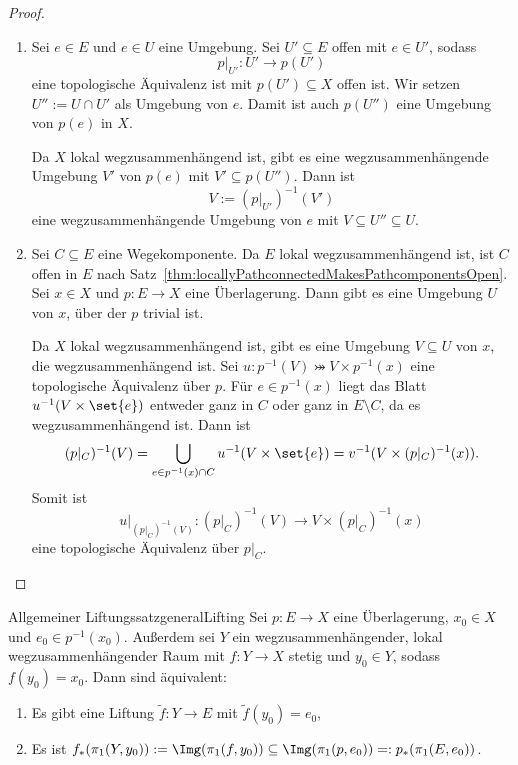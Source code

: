 \documentclass[language=ngerman]{TemplateLecture} %
\begin{document}
\begin{proof}
    \begin{enumerate}[$(i)$:]
        \item Sei $e \in E$ und $e \in U$ eine Umgebung. Sei $U' \subseteq E$ offen mit $e \in U'$, sodass
        \begin{equation*}
            p|_{U'} : U' \to p(U')
        \end{equation*}
        eine topologische Äquivalenz ist mit $p(U') \subseteq X$ offen ist. Wir setzen $U'' := U \cap U'$ als Umgebung von $e$. Damit ist auch $p(U'')$ eine Umgebung von $p(e)$ in $X$.

        Da $X$ lokal wegzusammenhängend ist, gibt es eine wegzusammenhängende Umgebung $V'$ von $p(e)$ mit $V' \subseteq p(U'')$. Dann ist
        \begin{equation*}
            V := \left(p|_{U'}\right)^{-1}(V')
        \end{equation*}
        eine wegzusammenhängende Umgebung von $e$ mit $V \subseteq U'' \subseteq U$.
        \item Sei $C \subseteq E$ eine Wegekomponente. Da $E$ lokal wegzusammenhängend ist, ist $C$ offen in $E$ nach Satz~\ref{thm:locallyPathconnectedMakesPathcomponentsOpen}. Sei $x \in X$ und $p: E \to X$ eine Überlagerung. Dann gibt es eine Umgebung $U$ von $x$, über der $p$ trivial ist.
        
        Da $X$ lokal wegzusammenhängend ist, gibt es eine Umgebung $V \subseteq U$ von $x$, die wegzusammenhängend ist. Sei $u: p^{-1}(V) \bij V \times p^{-1}(x)$ eine topologische Äquivalenz über $p$. Für $e \in p^{-1}(x)$ liegt das Blatt $u^{-1}(V \times \set{e})$ entweder ganz in $C$ oder ganz in $E \setminus C$, da es wegzusammenhängend ist. Dann ist 
        \begin{equation*}
            (p|_C)^{-1}(V) = \bigcup_{e \in p^{-1}(x) \cap C} u^{-1}(V \times \set{e}) = v^{-1}(V \times (p|_C)^{-1}(x)).
        \end{equation*}
        Somit ist 
        \begin{equation*}
            u|_{(p|_C)^{-1}(V)}: (p|_C)^{-1}(V) \to V \times (p|_C)^{-1}(x)
        \end{equation*}
        eine topologische Äquivalenz über $p|_C$.
    \end{enumerate}
\end{proof}

\begin{thm}{Allgemeiner Liftungssatz}{generalLifting}
    Sei $p: E \to X$ eine Überlagerung, $x_0 \in X$ und $e_0 \in p^{-1}(x_0)$. Außerdem sei $Y$ ein wegzusammenhängender, lokal wegzusammenhängender Raum mit $f: Y \to X$ stetig und $y_0 \in Y$, sodass $f(y_0) = x_0$. Dann sind äquivalent:
    \begin{enumerate}[$(i)$]
        \item Es gibt eine Liftung $\tilde{f}: Y \to E$ mit $\tilde{f}(y_0) = e_0$,
        \item Es ist $f_*(\pi_1(Y,y_0)) := \Img(\pi_1(f,y_0)) \subseteq \Img(\pi_1(p, e_0)) =: p_*(\pi_1(E, e_0))$.
    \end{enumerate}
\end{thm}
\end{document}
